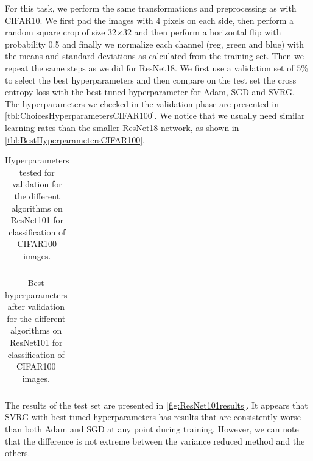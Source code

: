 \documentclass[a4paper,11pt,oneside]{report}
\begin{document}
For this task, we perform the same transformations and preprocessing as with CIFAR10. We first pad the images with 4 pixels on each side, then perform a random square crop of size 32×32 and then perform a horizontal flip with probability 0.5 and finally we normalize each channel (reg, green and blue) with the means and standard deviations as calculated from the training set. Then we repeat the same steps as we did for ResNet18. We first use a validation set of $5\%$ to select the best hyperparameters and then compare on the test set the cross entropy loss with the best tuned hyperparameter for Adam, SGD and SVRG. The hyperparameters we checked in the validation phase are presented in \autoref{tbl:ChoicesHyperparametersCIFAR100}. We notice that we usually need similar learning rates than the smaller ResNet18 network, as shown in \autoref{tbl:BestHyperparametersCIFAR100}.

\begin{table}
    \begin{center}
        \begin{tabular}{||c | c | l||}
             \hline
             
        \end{tabular}
    \end{center}
    \caption{Hyperparameters tested for validation for the different algorithms on ResNet101 for classification of CIFAR100 images.
    }
    \label{tbl:ChoicesHyperparametersCIFAR100}
\end{table}

\begin{table}
    \begin{center}
        \begin{tabular}{||c | c | l||}
             \hline
             
        \end{tabular}
    \end{center}
    \caption{Best hyperparameters after validation for the different algorithms on ResNet101 for classification of CIFAR100 images.
    }
    \label{tbl:BestHyperparametersCIFAR100}
\end{table}

The results of the test set are presented in \autoref{fig:ResNet101results}. It appears that SVRG with best-tuned hyperparameters has results that are consistently worse than both Adam and SGD at any point during training. However, we can note that the difference is not extreme between the variance reduced method and the others.
\end{document}

